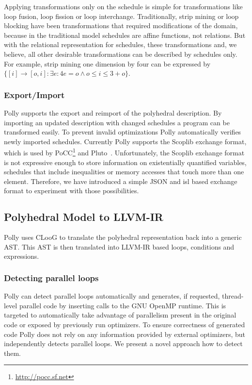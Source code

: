 Applying transformations only on the schedule is simple for transformations
like loop fusion, loop fission or loop interchange. Traditionally, strip mining
or loop blocking have been transformations that required modifications of
the domain, because in the traditional model schedules are affine functions, not
relations. But with the relational representation for schedules, these
transformations and, we believe, all other desirable transformations can be
described by schedules only. For example, strip mining one dimension by four
can be expressed by
$\{[i] \rightarrow [o, i] : \exists e : 4e = o \land o \le i \le 3 + o\}$.

\subsubsection{Export/Import}

Polly supports the export and reimport of the polyhedral description.  By
importing an updated description with changed schedules a program can be
transformed easily. To prevent invalid optimizations Polly automatically verifies
newly imported schedules. 
Currently Polly supports the Scoplib exchange format, which is used by
PoCC\footnote{\url{http://pocc.sf.net}} and Pluto~\cite{uday08pldi}.
Unfortunately, the Scoplib exchange format is not expressive enough to store
information on existentially quantified variables, schedules that include
inequalities or memory accesses that touch more than one element. Therefore, we
have introduced a simple JSON\cite{rfc4627} and isl based exchange format to
experiment with those possibilities.

\subsection{Polyhedral Model to LLVM-IR}
Polly uses CLooG \cite{Bas04b} to translate the polyhedral representation back
into a generic AST. This AST is then
translated into LLVM-IR based loops, conditions and expressions.

\subsubsection{Detecting parallel loops}
Polly can detect parallel loops automatically and generates, if requested,
thread-level parallel code by inserting calls to the GNU OpenMP runtime. This
is targeted to automatically take advantage of parallelism present in the
original code or exposed by previously run optimizers. To ensure correctness of
generated code Polly does not rely on any information provided by external
optimizers, but independently detects parallel loops. We present a novel
approach how to detect them.

